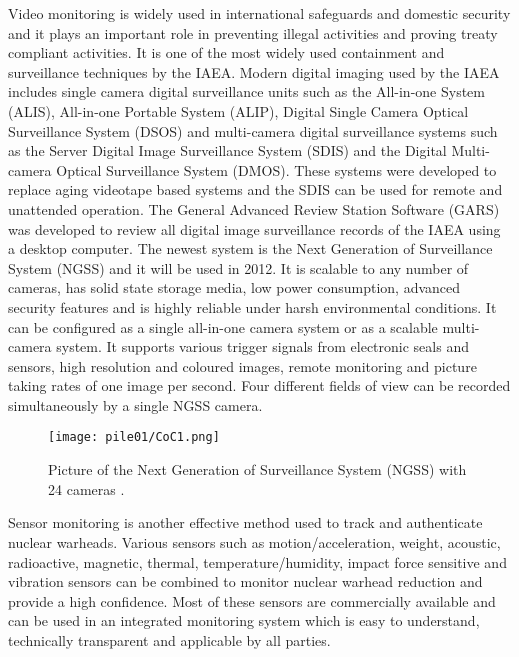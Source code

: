 \documentclass[twoside,titlepage,11pt,twocolumn,a4paper]{article}
\begin{document}
Video monitoring is widely used in international safeguards and
domestic security and it plays an important role in preventing illegal
activities and proving treaty compliant activities. It is one of the
most widely used containment and surveillance techniques by the
IAEA. \citep{wuwen2004} Modern digital imaging used by the IAEA
includes single camera digital surveillance units such as the
All-in-one System (ALIS), All-in-one Portable System (ALIP), Digital
Single Camera Optical Surveillance System (DSOS) and multi-camera
digital surveillance systems such as the Server Digital Image
Surveillance System (SDIS) and the Digital Multi-camera Optical
Surveillance System (DMOS). These systems were developed to replace
aging videotape based systems and the SDIS can be used for remote and
unattended operation. The General Advanced Review Station Software
(GARS) was developed to review all digital image surveillance records
of the IAEA using a desktop
computer. \citep{equipmentIAEAinspectors2002} The newest system is the
Next Generation of Surveillance System (NGSS) and it will be used in
2012. It is scalable to any number of cameras, has solid state storage
media, low power consumption, advanced security features and is highly
reliable under harsh environmental conditions. It can be configured as
a single all-in-one camera system or as a scalable multi-camera
system. It supports various trigger signals from electronic seals and
sensors, high resolution and coloured images, remote monitoring and
picture taking rates of one image per second. Four different fields of
view can be recorded simultaneously by a single NGSS
camera. \citep{IAEAsafeguards2011}

\begin{figure}
  \texttt{[image: pile01/CoC1.png]}
  \caption{Picture of the Next Generation of Surveillance System
    (NGSS) with 24 cameras \citep{IAEAsafeguards2011}.}
\end{figure}

Sensor monitoring is another effective method used to track and
authenticate nuclear warheads.  Various sensors such as
motion/acceleration, weight, acoustic, radioactive, magnetic, thermal,
temperature/humidity, impact force sensitive and vibration sensors can
be combined to monitor nuclear warhead reduction and provide a high
confidence. Most of these sensors are commercially available and can
be used in an integrated monitoring system which is easy to
understand, technically transparent and applicable by all
parties. \citep{wuwen2004}
\end{document}
